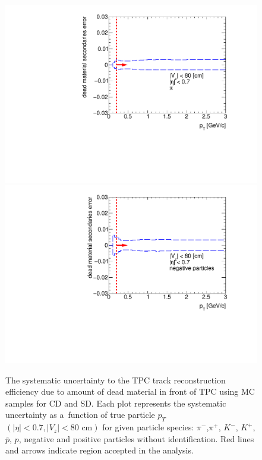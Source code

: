 \begin{figure}[hb]
{  \includegraphics[width=\linewidth,page=6]{graphics/systematicsEfficiency/deadMaterial/secondaries_Unbinned_SDCD_1D.pdf}\\
  \includegraphics[width=\linewidth,page=2]{graphics/systematicsEfficiency/deadMaterial/secondaries_Unbinned_Charged_SDCD1D.pdf}
}%
\caption[The systematic uncertainty to the TPC track reconstruction efficiency due to  amount of dead material in front of TPC using MC samples for CD and SD]{The systematic uncertainty to the TPC track reconstruction efficiency due to  amount of dead material in front of TPC using MC samples for CD and SD. Each plot represents the systematic uncertainty as a~function of true particle $p_T$ $\left(|\eta|<0.7, |V_{z}|<80 \text{ cm}\right)$ for given particle species: $\pi^-$,$\pi^+$, $K^-$, $K^+$, $\bar{p}$, $p$, negative and positive particles without identification. Red lines and arrows indicate region accepted in the analysis.}\label{fig:dead_materialCDSD1D}
\end{figure}



